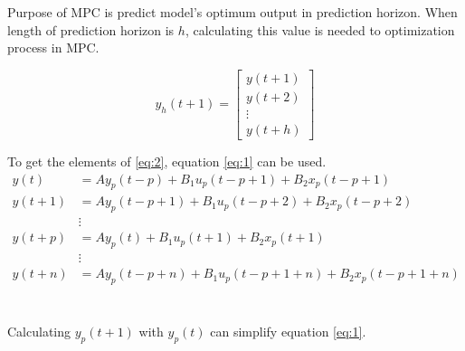 \documentclass{article}
\begin{document}
Purpose of MPC is predict model's optimum output in prediction horizon. 
When length of prediction horizon is $h$, calculating this value is needed to optimization process in MPC.

\begin{equation}\label{eq:2}
	y_h(t+1) =
	\begin{bmatrix}
		y(t+1)\\
		y(t+2)\\
		\vdots\\
		y(t+h)
	\end{bmatrix}
\end{equation}

To get the elements of \eqref{eq:2}, equation \eqref{eq:1} can be used.
\begin{align*}
	y(t) &= Ay_p(t-p) + B_{1}u_p(t-p+1) + B_{2}x_p(t-p+1)\\
	y(t+1) &= Ay_p(t-p+1) + B_{1}u_p(t-p+2) + B_{2}x_p(t-p+2)\\
	& \vdots\\
	y(t+p) &= Ay_p(t) + B_{1}u_p(t+1) + B_{2}x_p(t+1)\\
	& \vdots\\
	y(t+n) &= Ay_p(t-p+n) + B_1u_p(t-p+1+n) + B_2x_p(t-p+1+n)
\end{align*}
\\\\

Calculating $y_p(t+1)$ with $y_p(t)$ can simplify equation \eqref{eq:1}.
\end{document}
